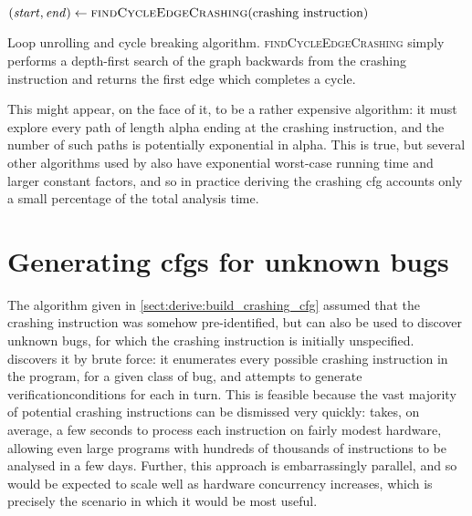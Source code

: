 \begin{sanefig}
\begin{algorithmic}
     \State $(\mathit{start}, \mathit{end}) \gets \textsc{findCycleEdgeCrashing}(\text{crashing instruction})$
        \EndFor
     \EndIf
  \EndWhile
  \EndFunction
\end{algorithmic}
\caption{Loop unrolling and cycle breaking algorithm.
  \textsc{findCycleEdgeCrashing} simply performs a depth-first search
  of the graph backwards from the crashing instruction and returns the
  first edge which completes a cycle.}
\label{fig:derive:read:unroll_cycle_break}
\end{sanefig}

This might appear, on the face of it, to be a rather expensive
algorithm: it must explore every path of length \gls{alpha} ending at
the crashing instruction, and the number of such paths is potentially
exponential in \gls{alpha}.  This is true, but several other
algorithms used by {\implementation} also have exponential worst-case
running time and larger constant factors, and so in practice deriving
the crashing \gls{cfg} accounts only a small percentage of the total
analysis time.

\section[Generating \glsentryplural{cfg} for unknown bugs]{Generating \glspl{cfg} for unknown bugs}
\label{sect:derive:unknown_bugs}

The algorithm given in \autoref{sect:derive:build_crashing_cfg}
assumed that the \gls{crashing instruction} was somehow
pre-identified, but {\technique} can also be used to discover unknown
bugs, for which the \gls{crashing instruction} is initially
unspecified.  {\Technique} discovers it by brute force: it enumerates
every possible \gls{crashing instruction} in the program, for a given
class of bug, and attempts to generate \glspl{verificationcondition}
for each in turn.  This is feasible because the vast majority of
potential \glspl{crashing instruction} can be dismissed very quickly:
{\implementation} takes, on average, a few seconds to process each
instruction on fairly modest hardware, allowing even large programs
with hundreds of thousands of instructions to be analysed in a few
days.  Further, this approach is embarrassingly parallel, and so would
be expected to scale well as hardware concurrency increases, which is
precisely the scenario in which it would be most useful.

